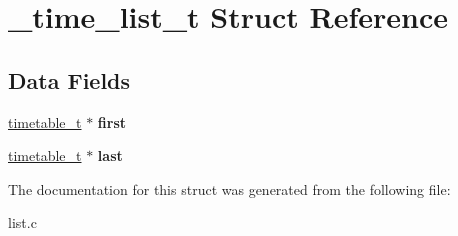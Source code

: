 \hypertarget{struct__time__list__t}{}\section{\+\_\+time\+\_\+list\+\_\+t Struct Reference}
\label{struct__time__list__t}
\subsection*{Data Fields}
\begin{DoxyCompactItemize}
\item 
\hypertarget{struct__time__list__t_a50f261ca2ee5b31702bb2cc67cf68669}{}\hyperlink{struct__timetable__t}{timetable\+\_\+t} $\ast$ {\bfseries first}\label{struct__time__list__t_a50f261ca2ee5b31702bb2cc67cf68669}

\item 
\hypertarget{struct__time__list__t_af4568993cb9410596b64b093426c02e7}{}\hyperlink{struct__timetable__t}{timetable\+\_\+t} $\ast$ {\bfseries last}\label{struct__time__list__t_af4568993cb9410596b64b093426c02e7}

\end{DoxyCompactItemize}


The documentation for this struct was generated from the following file\+:\begin{DoxyCompactItemize}
\item 
list.\+c\end{DoxyCompactItemize}
